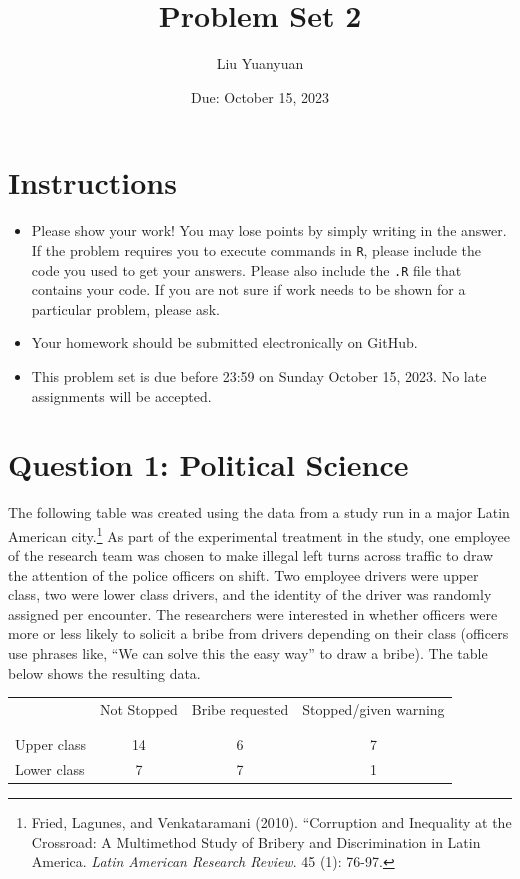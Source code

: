 \documentclass[12pt,letterpaper]{article}
\title{Problem Set 2}
\date{Due: October 15, 2023}
\author{Liu Yuanyuan}
\begin{document}
	\maketitle
	\section*{Instructions}
\begin{itemize}
	\item Please show your work! You may lose points by simply writing in the answer. If the problem requires you to execute commands in \texttt{R}, please include the code you used to get your answers. Please also include the \texttt{.R} file that contains your code. If you are not sure if work needs to be shown for a particular problem, please ask.
	\item Your homework should be submitted electronically on GitHub.
	\item This problem set is due before 23:59 on Sunday October 15, 2023. No late assignments will be accepted.

\end{itemize}

	
	\vspace{.5cm}
	\section*{Question 1: Political Science}
		\vspace{.25cm}
	The following table was created using the data from a study run in a major Latin American city.\footnote{Fried, Lagunes, and Venkataramani (2010). ``Corruption and Inequality at the Crossroad: A Multimethod Study of Bribery and Discrimination in Latin America. \textit{Latin American Research Review}. 45 (1): 76-97.} As part of the experimental treatment in the study, one employee of the research team was chosen to make illegal left turns across traffic to draw the attention of the police officers on shift. Two employee drivers were upper class, two were lower class drivers, and the identity of the driver was randomly assigned per encounter. The researchers were interested in whether officers were more or less likely to solicit a bribe from drivers depending on their class (officers use phrases like, ``We can solve this the easy way'' to draw a bribe). The table below shows the resulting data.

\newpage
\begin{table}[h!]
	\centering
	\begin{tabular}{l | c c c }
		& Not Stopped & Bribe requested & Stopped/given warning \\
		\\[-1.8ex] 
		\hline \\[-1.8ex]
		Upper class & 14 & 6 & 7 \\
		Lower class & 7 & 7 & 1 \\
		\hline
	\end{tabular}
\end{table}
\end{document}
